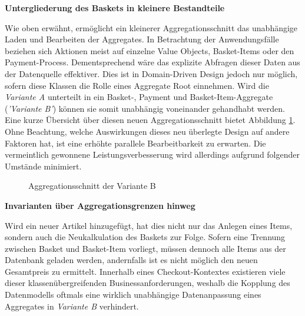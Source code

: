 \textbf{Untergliederung des Baskets in kleinere Bestandteile}

Wie oben erwähnt, ermöglicht ein kleinerer Aggregationsschnitt das unabhängige Laden und Bearbeiten der Aggregates. In Betrachtung der Anwendungsfälle beziehen sich Aktionen meist auf einzelne Value Objects, Basket-Items oder den Payment-Process. Dementsprechend wäre das explizite Abfragen dieser Daten aus der Datenquelle effektiver. Dies ist in Domain-Driven Design jedoch nur möglich, sofern diese Klassen die Rolle eines Aggregate Root einnehmen. Wird die \emph{Variante A} unterteilt in ein Basket-, Payment und Basket-Item-Aggregate (\emph{'Variante B'}) können sie somit unabhängig voneinander gehandhabt werden. Eine kurze Übersicht über diesen neuen Aggregationsschnitt bietet Abbildung \ref{fig:VarB}. Ohne Beachtung, welche Auswirkungen dieses neu überlegte Design auf andere Faktoren hat, ist eine erhöhte parallele Bearbeitbarkeit zu erwarten. Die vermeintlich gewonnene Leistungsverbesserung wird allerdings aufgrund folgender Umstände minimiert.

\begin{figure}[htbp]
	\centering
	
	\caption{Aggregationsschnitt der Variante B}
	\label{fig:VarB}
\end{figure}

\vspace{1em}

\textbf{Invarianten über Aggregationsgrenzen hinweg}

Wird ein neuer Artikel hinzugefügt, hat dies nicht nur das Anlegen eines Items, sondern auch die Neukalkulation des Baskets zur Folge. Sofern eine Trennung zwischen Basket und Basket-Item vorliegt, müssen dennoch alle Items aus der Datenbank geladen werden, andernfalls ist es nicht möglich den neuen Gesamtpreis zu ermittelt. Innerhalb eines Checkout-Kontextes existieren viele dieser klassenübergreifenden Businessanforderungen, weshalb die Kopplung des Datenmodells oftmals eine wirklich unabhängige Datenanpassung eines Aggregates in \emph{Variante B} verhindert.

